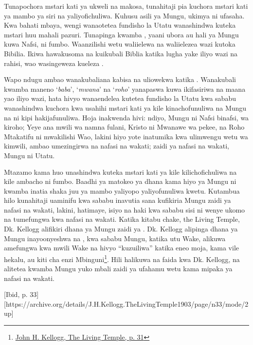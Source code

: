 Tunapochora mstari kati ya ukweli na makosa, tunahitaji pia kuchora mstari kati ya mambo ya siri na yaliyofichuliwa. Kuhusu asili ya Mungu, ukimya ni ufasaha. Kwa bahati mbaya, wengi wanaotetea fundisho la Utatu wanashindwa kuteka mstari huu mahali pazuri. Tunapinga kwamba , yaani ubora au hali ya Mungu kuwa Nafsi, ni fumbo. Waanzilishi wetu waliielewa na waliielezea wazi kutoka Bibilia. Ikiwa hawakusoma na kuikubali Biblia katika lugha yake iliyo wazi na rahisi, wao wasingeweza kueleza .


Wapo ndugu ambao wanakubaliana kabisa na  uliowekwa katika . Wanakubali kwamba maneno ‘\textit{baba}’, ‘\textit{mwana}’ na ‘\textit{roho}’ yanapaswa kuwa ikifasiriwa na maana yao iliyo wazi, hata hivyo wanaendelea kutetea fundisho la Utatu kwa sababu wanashindwa kuchora kwa usahihi mstari kati ya kile kinachofunuliwa na Mungu na ni kipi hakijafunuliwa. Hoja inakwenda hivi: ndiyo, Mungu ni Nafsi binafsi, wa kiroho; Yeye ana mwili wa namna fulani, Kristo ni Mwanawe wa pekee, na Roho Mtakatifu ni mwakilishi Wao, lakini hiyo yote inatumika kwa ulimwengu wetu wa kimwili, ambao umezingirwa na nafasi na wakati; zaidi ya nafasi na wakati, Mungu ni Utatu.


Mtazamo kama huo unashindwa kuteka mstari kati ya kile kilichofichuliwa na kile ambacho ni fumbo. Baadhi ya matokeo ya dhana kama hiyo ya Mungu ni kwamba inatia shaka juu ya mambo yaliyopo yaliyofunuliwa kwetu. Kutambua hilo kunahitaji uaminifu kwa sababu inavutia sana kufikiria Mungu zaidi ya nafasi na wakati, lakini, hatimaye, isiyo na haki kwa sababu sisi ni wenye ukomo na tumefungwa kwa nafasi na wakati. Katika kitabu chake, the Living Temple, Dk. Kellogg alifikiri dhana ya Mungu zaidi ya . Dk. Kellogg alipinga dhana ya Mungu inayoonyeshwa na , kwa sababu Mungu, katika utu Wake, alikuwa amefungwa kwa mwili Wake na hivyo “kuzuiliwa” katika eneo moja, kama vile hekalu, au kiti cha enzi Mbinguni\footnote{\href{https://archive.org/details/J.H.Kellogg.TheLivingTemple1903/page/n31/mode/2up}{John H. Kellogg, The Living Temple, p. 31}}. Hili halikuwa na faida kwa Dk. Kellogg, na alitetea kwamba Mungu yuko mbali zaidi ya ufahamu wetu kama mipaka ya nafasi na wakati.


[Ibid, p. 33][https://archive.org/details/J.H.Kellogg.TheLivingTemple1903/page/n33/mode/2up]


